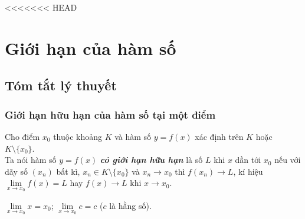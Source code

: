 <<<<<<< HEAD
\section{Giới hạn của hàm số}
\setcounter{dang}{0}
\subsection{Tóm tắt lý thuyết}
\begin{tomtat}
	\subsubsection{Giới hạn hữu hạn của hàm số tại một điểm}
	
	\begin{dn}
		Cho điểm $ x_0 $ thuộc khoảng $ K $ và hàm số $ y=f(x) $ xác định trên $ K $ hoặc $ K\setminus\{x_0\} $.\\
		Ta nói hàm số $ y=f(x) $ \textbf{\textit{có giới hạn hữu hạn}} là số $ L $ khi $ x $ dần tới $ x_0 $ nếu với dãy số $ (x_n) $ bất kì, $ x_n\in K\setminus\{x_0\} $ và $ x_n \to x_0 $ thì $ f(x_n)\to L $, kí hiệu $ \lim \limits_{x \to x_0} f(x) =L$ hay $ f(x)\to L $ khi $ x\to x_0 $.
	\end{dn}
	
	\begin{note} 
		$ \lim \limits_{x \to x_0} x=x_0 $; \quad $ \lim \limits_{x \to x_0} c=c $ ($ c $ là hằng số).
	\end{note} 

\end{tomtat}
